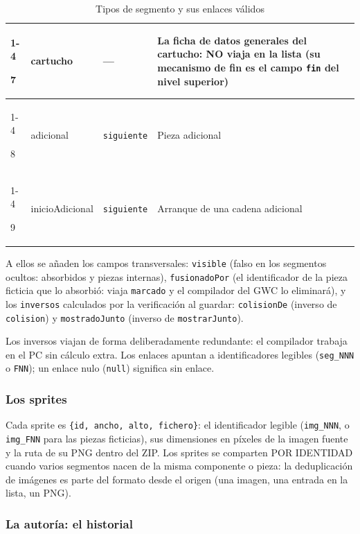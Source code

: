 \begin{table}[H]
\begin{tabularx}{\textwidth}{l l l X}
		\cmidrule(lr){1-4}
		
		7 & cartucho & --- & La ficha de datos generales del cartucho: NO viaja en la lista (su mecanismo de fin es el campo \texttt{fin} del nivel superior) \\
		
		\cmidrule(lr){1-4}
		
		8 & adicional & \texttt{siguiente} & Pieza adicional \\
		
		\cmidrule(lr){1-4}
		
		9 & inicioAdicional & \texttt{siguiente} & Arranque de una cadena adicional \\
		\bottomrule
	\end{tabularx}
	\caption{Tipos de segmento y sus enlaces válidos}
	\label{tab:F1A01Tipos}
\end{table}

A ellos se añaden los campos transversales: \texttt{visible} (falso en los
segmentos ocultos: absorbidos y piezas internas), \texttt{fusionadoPor} (el
identificador de la pieza ficticia que lo absorbió: viaja \texttt{marcado} y el
compilador del GWC lo eliminará), y los \texttt{inversos} calculados por la
verificación al guardar: \texttt{colisionDe} (inverso de \texttt{colision})
y \texttt{mostradoJunto} (inverso de \texttt{mostrarJunto}). 

Los inversos
viajan de forma deliberadamente redundante: el compilador trabaja en el PC
sin cálculo extra. Los enlaces apuntan a identificadores legibles
(\texttt{seg\_NNN} o \texttt{FNN}); un enlace nulo (\texttt{null}) significa
sin enlace.

\subsubsection*{Los sprites}
\label{sec:F1A01Sprites}

Cada sprite es \texttt{\{id, ancho, alto, fichero\}}: el identificador
legible (\texttt{img\_NNN}, o \texttt{img\_FNN} para las piezas ficticias),
sus dimensiones en píxeles de la imagen fuente y la ruta de su PNG dentro
del ZIP. Los sprites se comparten POR IDENTIDAD cuando varios segmentos
nacen de la misma componente o pieza: la deduplicación de imágenes es parte
del formato desde el origen (una imagen, una entrada en la lista, un PNG).


\subsubsection*{La autoría: el historial}
\label{sec:F1A01Autoria}

